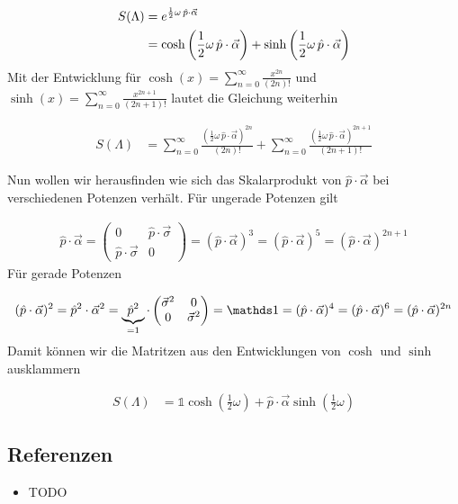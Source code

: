 \begin{align}
  \label{eq:23}
  S(\Lambda) &=e^{\frac{1}{2}\omega\,\hat p\cdot\vec \alpha  } \notag \\
&= \cosh\left(\frac{1}{2}\omega\,\hat p\cdot\vec \alpha\right) + \sinh\left(\frac{1}{2}\omega\,\hat p\cdot\vec \alpha \right)
\end{align}
Mit der Entwicklung für \(\cosh(x) = \sum_{n=0}^{\infty}\frac{x^{2n}}{(2n)!}\) und  \(\sinh(x) = \sum_{n=0}^{\infty}\frac{x^{2n+1}}{(2n+1)!}\) lautet die Gleichung weiterhin

\begin{align}
  \label{eq:24}
  S(\Lambda) &=\sum_{n=0}^{\infty}\frac{\left(\frac{1}{2}\omega\,\hat p\cdot\vec \alpha\right)^{2n}}{(2n)!} + \sum_{n=0}^{\infty}\frac{\left(\frac{1}{2}\omega\,\hat p\cdot\vec \alpha\right)^{2n+1}}{(2n+1)!}
\end{align}

Nun wollen wir herausfinden wie sich das Skalarprodukt von \(\hat p\cdot\vec \alpha\) bei verschiedenen Potenzen verhält. Für ungerade Potenzen gilt

\begin{align}
  \label{eq:25}
  \hat p\cdot\vec \alpha =
  \begin{pmatrix}
    0&\hat p\cdot\vec \sigma\\
    \hat p\cdot\vec \sigma&0
  \end{pmatrix} = (\hat p\cdot\vec \alpha)^3 =(\hat p\cdot\vec \alpha)^5 = (\hat p\cdot\vec \alpha)^{2n+1}
\end{align}
Für gerade Potenzen

\begin{align}
  \label{eq:26}
  (\hat p\cdot\vec \alpha)^2 =\hat p^2\cdot\vec \alpha^2 = \underbr{\hat p^2}_{=1}\cdot
  \begin{pmatrix}
    \vec \sigma^2&0\\
    0&\vec \sigma^2
  \end{pmatrix} = \mathds 1 = (\hat p\cdot\vec \alpha)^4 =(\hat p\cdot\vec \alpha)^6 = (\hat p\cdot\vec \alpha)^{2n}
\end{align}
Damit können wir die Matritzen aus den Entwicklungen von \(\cosh\) und \(\sinh\) ausklammern

\begin{align}
  \label{eq:27}
   S(\Lambda) &= \mathds 1 \cosh\left(\frac{1}{2}\omega\right) + \hat p\cdot\vec \alpha \sinh\left(\frac{1}{2}\omega \right)
\end{align}




\subsection*{Referenzen}
\begin{itemize}
\item TODO
\end{itemize}


